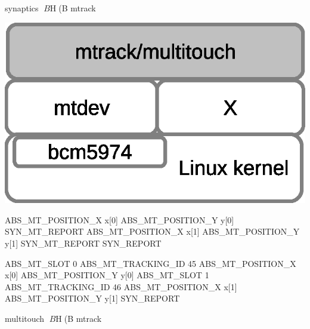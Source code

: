 {\begin{frame}{synaptics $B$H(B mtrack}
\begin{itemize}
\item mtrack $B$G$O!"%
$B$3$l$K$h$j$h$j:Y$+$$%


\end{itemize}

\end{frame}

\begin{frame}

\begin{center}
\includegraphics[width=0.3\hsize]{image201210/mtrack.eps}
\end{center}

\end{frame}

\begin{frame}[containsverbatim]

\begin{minipage}[t]{0.45\hsize}
\begin{commandline}
ABS_MT_POSITION_X x[0]
ABS_MT_POSITION_Y y[0]
SYN_MT_REPORT
ABS_MT_POSITION_X x[1]
ABS_MT_POSITION_Y y[1]
SYN_MT_REPORT
SYN_REPORT
\end{commandline}
\end{minipage}

\begin{minipage}[t]{0.45\hsize}
\begin{commandline}
ABS_MT_SLOT 0
ABS_MT_TRACKING_ID 45
ABS_MT_POSITION_X x[0]
ABS_MT_POSITION_Y y[0]
ABS_MT_SLOT 1
ABS_MT_TRACKING_ID 46
ABS_MT_POSITION_X x[1]
ABS_MT_POSITION_Y y[1]
SYN_REPORT
\end{commandline}
\end{minipage}

\end{frame}

\begin{frame}{multitouch $B$H(B mtrack}


\end{frame}}
